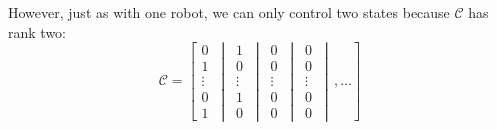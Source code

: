  However, just as with one robot, we can only control two states because $\mathcal{C}$ has rank two:
\begin{equation}
\mathcal{C}=\left[ \begin{matrix} 
0\\
1\\
\vdots\\
0\\
1
\end{matrix}
\,\middle\vert\,
  \begin{matrix} 
1\\
0\\
\vdots\\
1\\
0
\end{matrix}
\,\middle\vert\,
\begin{matrix} 
0\\
0\\
\vdots\\
0\\
0
\end{matrix}
\,\middle\vert\,
\begin{matrix} 
0\\
0\\
\vdots\\
0\\
0
\end{matrix}\,\middle\vert\,, 
\ldots \right]
\end{equation}  
